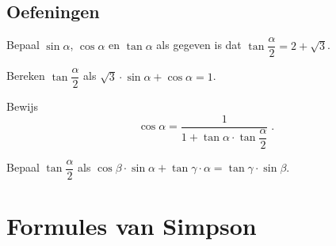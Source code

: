 \documentclass[a4paper,12pt]{article}
\begin{document}
\begin{theorie}

\subsection{Oefeningen}

\end{theorie}

\begin{oefening}
Bepaal $\sin\alpha$, $\cos\alpha$ en $\tan\alpha$ als gegeven is dat $\tan\dfrac{\alpha}{2}=2+\sqrt{3}$.
\end{oefening}

\begin{oefening}
Bereken $\tan\dfrac{\alpha}{2}$ als $\sqrt{3}\cdot\sin\alpha+\cos\alpha=1$.
\end{oefening}

\begin{oefening}
Bewijs
$$\cos\alpha=\dfrac{1}{1+\tan\alpha\cdot\tan\dfrac{\alpha}{2}}\;.$$
\end{oefening}

\begin{oefening}
Bepaal $\tan\dfrac{\alpha}{2}$ als $\cos\beta\cdot\sin\alpha+\tan\gamma\cdot\alpha=\tan\gamma\cdot\sin\beta$.
\end{oefening}


\newpage
\section{Formules van Simpson}
\end{document}
